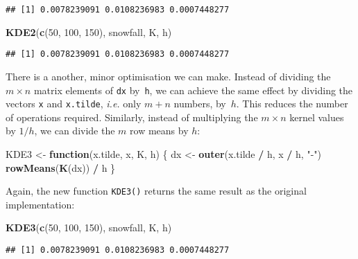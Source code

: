 \documentclass[
  a4paper,
]{article}
\newenvironment{Shaded}{\begin{snugshade}}{\end{snugshade}}
\newcommand{\ControlFlowTok}[1]{\textcolor[rgb]{0.13,0.29,0.53}{\textbf{#1}}}
\newcommand{\DecValTok}[1]{\textcolor[rgb]{0.00,0.00,0.81}{#1}}
\newcommand{\FunctionTok}[1]{\textcolor[rgb]{0.13,0.29,0.53}{\textbf{#1}}}
\newcommand{\NormalTok}[1]{#1}
\newcommand{\OtherTok}[1]{\textcolor[rgb]{0.56,0.35,0.01}{#1}}
\newcommand{\SpecialCharTok}[1]{\textcolor[rgb]{0.81,0.36,0.00}{\textbf{#1}}}
\newcommand{\StringTok}[1]{\textcolor[rgb]{0.31,0.60,0.02}{#1}}
\theoremstyle{definition}
\theoremstyle{definition}
\theoremstyle{definition}
\theoremstyle{definition}
\theoremstyle{remark}
\begin{document}
\begin{verbatim}
## [1] 0.0078239091 0.0108236983 0.0007448277
\end{verbatim}

\begin{Shaded}
\begin{Highlighting}[]
\FunctionTok{KDE2}\NormalTok{(}\FunctionTok{c}\NormalTok{(}\DecValTok{50}\NormalTok{, }\DecValTok{100}\NormalTok{, }\DecValTok{150}\NormalTok{), snowfall, K, h)}
\end{Highlighting}
\end{Shaded}

\begin{verbatim}
## [1] 0.0078239091 0.0108236983 0.0007448277
\end{verbatim}

There is a another, minor optimisation we can make. Instead of dividing the
\(m\times n\) matrix elements of \texttt{dx} by~\texttt{h}, we can achieve the same effect by
dividing the vectors \texttt{x} and \texttt{x.tilde}, \emph{i.e.} only \(m+n\) numbers, by~\(h\).
This reduces the number of operations required. Similarly, instead of
multiplying the \(m\times n\) kernel values by \(1/h\), we can divide the \(m\) row
means by \(h\):

\begin{Shaded}
\begin{Highlighting}[]
\NormalTok{KDE3 }\OtherTok{\textless{}{-}} \ControlFlowTok{function}\NormalTok{(x.tilde, x, K, h) \{}
\NormalTok{  dx }\OtherTok{\textless{}{-}} \FunctionTok{outer}\NormalTok{(x.tilde }\SpecialCharTok{/}\NormalTok{ h, x }\SpecialCharTok{/}\NormalTok{ h, }\StringTok{"{-}"}\NormalTok{)}
  \FunctionTok{rowMeans}\NormalTok{(}\FunctionTok{K}\NormalTok{(dx)) }\SpecialCharTok{/}\NormalTok{ h}
\NormalTok{\}}
\end{Highlighting}
\end{Shaded}

Again, the new function \texttt{KDE3()} returns the same result as the original
implementation:

\begin{Shaded}
\begin{Highlighting}[]
\FunctionTok{KDE3}\NormalTok{(}\FunctionTok{c}\NormalTok{(}\DecValTok{50}\NormalTok{, }\DecValTok{100}\NormalTok{, }\DecValTok{150}\NormalTok{), snowfall, K, h)}
\end{Highlighting}
\end{Shaded}

\begin{verbatim}
## [1] 0.0078239091 0.0108236983 0.0007448277
\end{verbatim}
\end{document}
